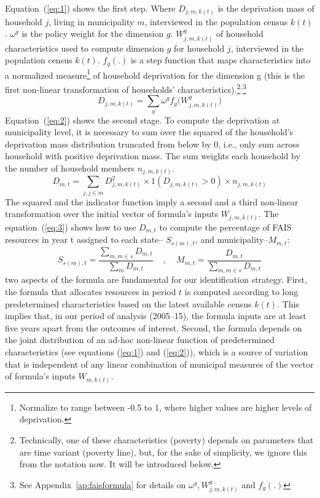 \documentclass[dv_diss_main.tex]{subfiles}
\begin{document}
Equation~(\ref{eq:1}) shows the first step. Where $D_{j,m,k(t)}$ is the deprivation mass of household $j$, living in municipality $m$, interviewed in the population census $k(t)$. $\omega^g$ is the policy weight for the dimension $g$. $W_{j,m,k(t)}^g$ of household characteristics used to compute dimension $g$ for household $j$, interviewed in the population census $k(t)$. $f_g(.)$ is a step function that maps characteristics into a normalized measure\footnote{ Normalize to range between -0.5 to 1, where higher values are higher levels of deprivation.}  of household deprivation for the dimension g (this is the first non-linear transformation of households’ characteristics).\footnote{Technically, one of these characteristics (poverty) depends on parameters that are time variant (poverty line), but, for the sake of simplicity, we ignore this from the notation now. It will be introduced below.}$^{,}$\footnote{See Appendix~\ref{ap:faisformula} for details on $\omega^g,W_{j,m,k(t)}^{g}$ and $f_g (.)$}
\begin{equation}\label{eq:1}
D_{j,m,k(t)}=\sum_g \omega^g f_g \big(W_{j,m,k(t)}^{g}\big)   
\end{equation}
Equation~(\ref{eq:2}) shows the second stage. To compute the deprivation at municipality level, it is necessary to sum over the squared of the household’s deprivation mass distribution truncated from below by 0, i.e., only sum across household with positive deprivation mass. The sum weights each household by the number of household members $n_{j,m,k(t)}$. 
\begin{equation}\label{eq:2}
D_{m,t}=\sum_{j,j\in m} D_{j,m,k(t)}^2 \times 1(D_{j,m,k(t)}>0) \times n_{j,m,k(t)} \end{equation}
The squared and the indicator function imply a second and a third non-linear transformation over the initial vector of formula’s inputs $W_{j,m,k(t)}$. The equation~(\ref{eq:3}) shows how to use $D_{m,t}$ to compute the percentage of FAIS resources in year t assigned to each state-- $S_{s(m),t}$, and municipality--$M_{m,t}$:
\begin{equation}\label{eq:3}
S_{s(m),t}=\frac{\sum_{m,m \in s}D_{m,t}}{\sum_m D_{m,t}}\;\;\;\;,\;\;\;\; M_{m,t}=\frac{D_{m,t}}{\sum_{m,m \in s}D_{m,t}}   
\end{equation}
\noindent two aspects of the formula are fundamental for our identification strategy. First, the formula that allocates resources in period $t$ is computed according to long predetermined characteristics based on the latest available census $k(t)$. This implies that, in our period of analysis (2005–15), the formula inputs are at least five years apart from the outcomes of interest. Second, the formula depends on the joint distribution of an ad-hoc non-linear function of predetermined characteristics (see equations (\ref{eq:1}) and (\ref{eq:2})), which is a source of variation that is independent of any linear combination of municipal measures of the vector of formula’s inputs $W_{m,k(t)}$.
\end{document}
